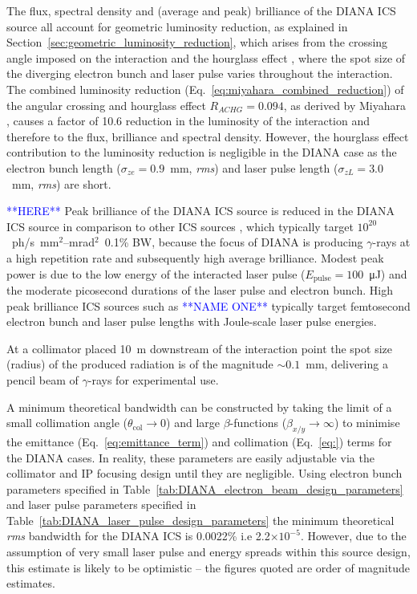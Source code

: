 \documentclass[../main.tex]{subfiles}
\begin{document}
The flux, spectral density and (average and peak) brilliance of the DIANA ICS source all account for geometric luminosity reduction, as explained in Section~\ref{sec:geometric_luminosity_reduction}, which arises from the crossing angle imposed on the interaction and the hourglass effect \cite{furman1991hourglass}, where the spot size of the diverging electron bunch and laser pulse varies throughout the interaction. The combined luminosity reduction (Eq.~\ref{eq:miyahara_combined_reduction}) of the angular crossing and hourglass effect $R_{ACHG}=0.094$, as derived by Miyahara \cite{miyahara2008luminosity}, causes a factor of 10.6 reduction in the luminosity of the interaction and therefore to the flux, brilliance and spectral density. However, the hourglass effect contribution to the luminosity reduction is negligible in the DIANA case as the electron bunch length ($\sigma_{ze}=0.9$~\si{\milli\meter}, \textit{rms}) and laser pulse length ($\sigma_{zL}=3.0$~\si{\milli\meter}, \textit{rms}) are short.  

\textcolor{blue}{**HERE**}
Peak brilliance of the DIANA ICS source is reduced in the DIANA ICS source in comparison to other ICS sources \cite{}, which typically target $10^{20}$~ph/\si{\second}~\si{\milli\meter}$^{2}$--\si{\milli\radian}$^{2}$~0.1\% BW,  because the focus of DIANA is producing $\gamma$-rays at a high repetition rate and subsequently high average brilliance. Modest peak power is due to the low energy of the interacted laser pulse ($E_{\mathrm{pulse}} = 100$~\si{\micro\joule}) and the moderate picosecond durations of the laser pulse and electron bunch. High peak brilliance ICS sources such as \textcolor{blue}{**NAME ONE**} typically target femtosecond electron bunch and laser pulse lengths with Joule-scale laser pulse energies. 

At a collimator placed 10~\si{\meter} downstream of the interaction point the spot size (radius) of the produced radiation is of the magnitude $\sim0.1$~\si{\milli\meter}, delivering a pencil beam of $\gamma$-rays for experimental use.

A minimum theoretical bandwidth can be constructed by taking the limit of a small collimation angle ($\theta_{\mathrm{col}}\rightarrow 0$) and large $\beta$-functions ($\beta_{x/y}\rightarrow\infty$) to minimise the emittance (Eq.~\ref{eq:emittance_term}) and collimation (Eq.~\ref{eq:}) terms for the DIANA cases. In reality, these parameters are easily adjustable via the collimator and IP focusing design until they are negligible. Using electron bunch parameters specified in Table~\ref{tab:DIANA_electron_beam_design_parameters} and laser pulse parameters specified in Table~\ref{tab:DIANA_laser_pulse_design_parameters} the minimum theoretical \textit{rms} bandwidth for the DIANA ICS is 0.0022\% i.e 2.2$\times 10^{-5}$. However, due to the assumption of very small laser pulse and energy spreads within this source design, this estimate is likely to be optimistic -- the figures quoted are order of magnitude estimates. 
\end{document}
